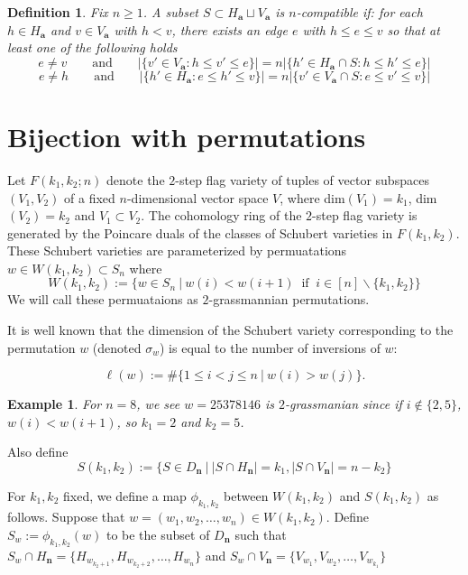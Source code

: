 \documentclass{amsart}
\newtheorem{dfn}{Definition}
\newtheorem{ex}{Example}
\newcommand{\bfa}{\mathbf{a}}
\newcommand{\bfn}{\mathbf{n}}
\begin{document}
  \begin{dfn}
    Fix $n\ge1$.
    A subset $S\subset H_\bfa\sqcup V_\bfa$ is \emph{$n$-compatible} if: for each $h\in H_\bfa$ and $v\in V_\bfa$ with $h<v$, there exists an edge $e$ with $h\le e\le v$ so that at least one of the following holds
    \[e\ne v \qquad \text{and} \qquad \big|\{v'\in V_\bfa:h\le v'\le e\}\big|=n\big|\{h'\in H_\bfa\cap S:h\le h'\le e\}\big|\]
    \[e\ne h \qquad \text{and} \qquad \big|\{h'\in H_\bfa:e\le h'\le v\}\big|=n\big|\{v'\in V_\bfa\cap S:e\le v'\le v\}\big|\]
  \end{dfn}

\section{Bijection with permutations}
Let $F(k_1,k_2;n)$ denote the $2$-step flag variety of tuples of vector subspaces $(V_1,V_2)$ of a fixed $n$-dimensional vector space $V$, where dim$(V_1)=k_1$, dim$(V_2)=k_2$ and $V_1\subset V_2$. The cohomology ring of the $2$-step flag variety is generated by the Poincare duals of the classes of Schubert varieties in $F(k_1,k_2)$. These Schubert varieties are parameterized by permuatations $w\in W(k_1,k_2)\subset S_n$ where
\[W(k_1,k_2):=\{w\in S_n \ | \ w(i)<w(i+1) \ \mbox{ if } \ i\in [n]\backslash \{k_1,k_2\}\}\]
We will call these permuataions as $2$-grassmannian permutations. 

It is well known that the dimension of the Schubert variety corresponding to the permutation $w$ (denoted $\sigma_w$) is equal to the number of inversions of $w$: 

\[\ell(w):=\#\{1\leq i<j\leq n \ | \ w(i)>w(j)\}.\]

\begin{ex}\label{ex:2step}
For $n=8$, we see $w=25378146$ is $2$-grassmanian since if $i\not\in\{2,5\}$, $w(i)<w(i+1)$, so $k_1=2$ and $k_2=5$. 

\end{ex}

Also define 
\[ S(k_1,k_2):= \{ S\in D_\bfn  \ | \  |S\cap H_\bfn|=k_1, |S\cap V_\bfn|=n-k_2\} \]


For $k_1,k_2$ fixed, we define a map $\phi_{k_1,k_2}$ between $W(k_1,k_2)$ and $S(k_1,k_2)$ as follows. Suppose that $w =(w_1,w_2,\ldots,w_n)  \in W(k_1,k_2)$. Define $S_w:=\phi_{k_1,k_2} (w)$ to be the subset of $D_\bfn$ such that $S_w \cap H_\bfn=\{ H_{w_{k_2 +1}},H_{w_{k_2 +2}}, \ldots, H_{w_n} \}$ and $S_w \cap V_\bfn = \{V_{w_1},V_{w_2},\ldots,V_{w_{k_1}}\}$  
\end{document}
